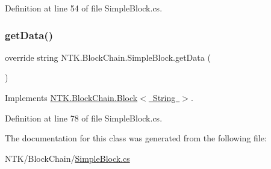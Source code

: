 Definition at line 54 of file Simple\+Block.\+cs.

\mbox{\label{class_n_t_k_1_1_block_chain_1_1_simple_block_a733c9456735bd3a0fc50ee2a95ef657c}} 
\subsubsection{\texorpdfstring{getData()}{getData()}}
{\footnotesize\ttfamily override string N\+T\+K.\+Block\+Chain.\+Simple\+Block.\+get\+Data (\begin{DoxyParamCaption}{ }\end{DoxyParamCaption})\hspace{0.3cm}{\ttfamily [virtual]}}



Implements \mbox{\hyperlink{class_n_t_k_1_1_block_chain_1_1_block_ad65b166bcac81fb5a04e52f2d5b53f57}{N\+T\+K.\+Block\+Chain.\+Block$<$ String $>$}}.



Definition at line 78 of file Simple\+Block.\+cs.



The documentation for this class was generated from the following file\+:\begin{DoxyCompactItemize}
\item 
N\+T\+K/\+Block\+Chain/\mbox{\hyperlink{_simple_block_8cs}{Simple\+Block.\+cs}}\end{DoxyCompactItemize}
